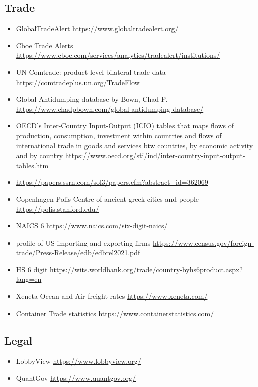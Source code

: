 \documentclass[10pt]{article} %
\begin{document}
    \subsection{Trade}
        \begin{itemize}
            \item GlobalTradeAlert \url{https://www.globaltradealert.org/}
            \item Cboe Trade Alerts \url{https://www.cboe.com/services/analytics/tradealert/institutions/}
            \item UN Comtrade: product level bilateral trade data \url{https://comtradeplus.un.org/TradeFlow}
            \item Global Antidumping database by Bown, Chad P. \url{https://www.chadpbown.com/global-antidumping-database/}
            \item OECD's Inter-Country Input-Output (ICIO) tables that maps flows of production, consumption, investment within countries and flows of international trade in goods and services btw countries, by economic activity and by country \url{https://www.oecd.org/sti/ind/inter-country-input-output-tables.htm}
            \item \cite{FeenstraRomalisSchott2002} \url{https://papers.ssrn.com/sol3/papers.cfm?abstract_id=362069}
            \item Copenhagen Polis Centre of ancient greek cities and people \url{https://polis.stanford.edu/}
            \item NAICS 6 \url{https://www.naics.com/six-digit-naics/}
            \item profile of US importing and exporting firms \url{https://www.census.gov/foreign-trade/Press-Release/edb/edbrel2021.pdf}
            \item HS 6 digit \url{https://wits.worldbank.org/trade/country-byhs6product.aspx?lang=en}
            \item Xeneta Ocean and Air freight rates \url{https://www.xeneta.com/}
            \item Container Trade statistics \url{https://www.containerstatistics.com/}
        \end{itemize}

    \subsection{Legal}
        \begin{itemize}
        \item LobbyView \url{https://www.lobbyview.org/}
        \item QuantGov \url{https://www.quantgov.org/}
        \end{itemize}
    
\end{document}
